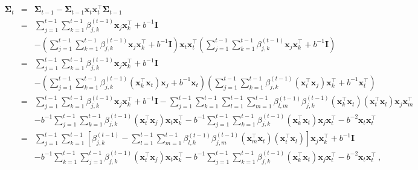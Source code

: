 \begin{eqnarray*}
\mathbf{\Sigma}_{t} & = & \mathbf{\Sigma}_{t-1}-\mathbf{\Sigma}_{t-1}\mathbf{x}_{t}\mathbf{x}_{t}^{\top}\mathbf{\Sigma}_{t-1}\\
 & = & \sum_{j=1}^{t-1}\sum_{k=1}^{t-1}\beta_{j,k}^{\left(t-1\right)}\mathbf{x}_{j}\mathbf{x}_{k}^{\top}+b^{-1}\mathbf{I}\\
 &&-\left(\sum_{j=1}^{t-1}\sum_{k=1}^{t-1}\beta_{j,k}^{\left(t-1\right)}\mathbf{x}_{j}\mathbf{x}_{k}^{\top}+b^{-1}\mathbf{I}\right)\mathbf{x}_{t}\mathbf{x}_{t}^{\top}\left(\sum_{j=1}^{t-1}\sum_{k=1}^{t-1}\beta_{j,k}^{\left(t-1\right)}\mathbf{x}_{j}\mathbf{x}_{k}^{\top}+b^{-1}\mathbf{I}\right)\\
 & = & \sum_{j=1}^{t-1}\sum_{k=1}^{t-1}\beta_{j,k}^{\left(t-1\right)}\mathbf{x}_{j}\mathbf{x}_{k}^{\top}+b^{-1}\mathbf{I}\\
 &&-\left(\sum_{j=1}^{t-1}\sum_{k=1}^{t-1}\beta_{j,k}^{\left(t-1\right)}\left(\mathbf{x}_{k}^{\top}\mathbf{x}_{t}\right)\mathbf{x}_{j}+b^{-1}\mathbf{x}_{t}\right)\left(\sum_{j=1}^{t-1}\sum_{k=1}^{t-1}\beta_{j,k}^{\left(t-1\right)}\left(\mathbf{x}_{t}^{\top}\mathbf{x}_{j}\right)\mathbf{x}_{k}^{\top}+b^{-1}\mathbf{x}_{t}^{\top}\right)\\
 & = & \sum_{j=1}^{t-1}\sum_{k=1}^{t-1}\beta_{j,k}^{\left(t-1\right)}\mathbf{x}_{j}\mathbf{x}_{k}^{\top}+b^{-1}\mathbf{I}-\sum_{j=1}^{t-1}\sum_{k=1}^{t-1}\sum_{l=1}^{t-1}\sum_{m=1}^{t-1}\beta_{l,m}^{\left(t-1\right)}\beta_{j,k}^{\left(t-1\right)}\left(\mathbf{x}_{k}^{\top}\mathbf{x}_{t}\right)\left(\mathbf{x}_{t}^{\top}\mathbf{x}_{l}\right)\mathbf{x}_{j}\mathbf{x}_{m}^{\top}\\
 &  & -b^{-1}\sum_{j=1}^{t-1}\sum_{k=1}^{t-1}\beta_{j,k}^{\left(t-1\right)}\left(\mathbf{x}_{t}^{\top}\mathbf{x}_{j}\right)\mathbf{x}_{t}\mathbf{x}_{k}^{\top}-b^{-1}\sum_{j=1}^{t-1}\sum_{k=1}^{t-1}\beta_{j,k}^{\left(t-1\right)}\left(\mathbf{x}_{k}^{\top}\mathbf{x}_{t}\right)\mathbf{x}_{j}\mathbf{x}_{t}^{\top}-b^{-2}\mathbf{x}_{t}\mathbf{x}_{t}^{\top}\\
 & = & \sum_{j=1}^{t-1}\sum_{k=1}^{t-1}\left[\beta_{j,k}^{\left(t-1\right)}-\sum_{l=1}^{t-1}\sum_{m=1}^{t-1}\beta_{l,k}^{\left(t-1\right)}\beta_{j,m}^{\left(t-1\right)}\left(\mathbf{x}_{m}^{\top}\mathbf{x}_{t}\right)\left(\mathbf{x}_{t}^{\top}\mathbf{x}_{l}\right)\right]\mathbf{x}_{j}\mathbf{x}_{k}^{\top}+b^{-1}\mathbf{I}\\
 &  & -b^{-1}\sum_{k=1}^{t-1}\sum_{j=1}^{t-1}\beta_{j,k}^{\left(t-1\right)}\left(\mathbf{x}_{t}^{\top}\mathbf{x}_{j}\right)\mathbf{x}_{t}\mathbf{x}_{k}^{\top}-b^{-1}\sum_{j=1}^{t-1}\sum_{k=1}^{t-1}\beta_{j,k}^{\left(t-1\right)}\left(\mathbf{x}_{k}^{\top}\mathbf{x}_{t}\right)\mathbf{x}_{j}\mathbf{x}_{t}^{\top}-b^{-2}\mathbf{x}_{t}\mathbf{x}_{t}^{\top}~,
\end{eqnarray*}
